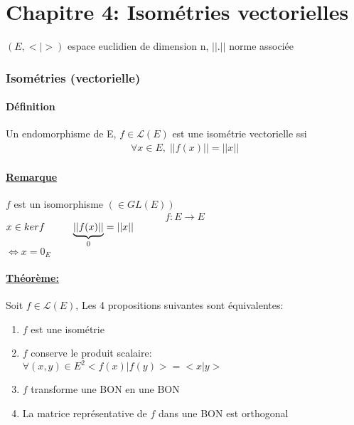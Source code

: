 \documentclass{article}
\author{Frederic Becerril}
\newcommand\tab[1][1cm]{\hspace*{#1}}
\begin{document}
\part*{Chapitre 4: Isométries vectorielles}

$(E, <|>)$ espace euclidien de dimension n, $||.||$ norme associée

\section{Isométries (vectorielle)}

\subsection{Définition} Un endomorphisme de E, $f \in \mathcal{L}(E)$ est une isométrie vectorielle ssi\\
\begin{align*}
    \forall x \in E, \; ||f(x)|| = ||x||
\end{align*}

\subsection{\underline{Remarque}} $f$ est un isomorphisme $(\in GL(E))$
\begin{align*}
    f : E \rightarrow E
\end{align*}
$x \in ker f \tab \underset{0}{\underbrace{||f(x)||}} = ||x||$\\
$\Leftrightarrow x = 0_E$

\subsection{\underline{Théorème:}} Soit $f \in \mathcal{L}(E)$, Les 4 propositions suivantes sont équivalentes:
\begin{enumerate}
    \item $f$ est une isométrie
    \item $f$ conserve le produit scalaire:\\
    $\forall(x, y) \in E^2 <f(x)|f(y)> = <x|y>$
    \item $f$ transforme une BON en une BON
    \item La matrice représentative de $f$ dans une BON est orthogonal
\end{enumerate}

\newpage
\end{document}
